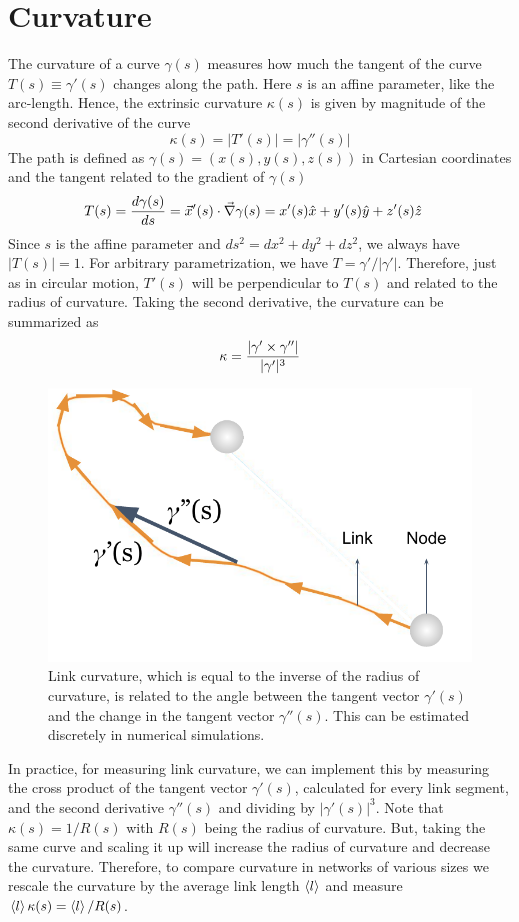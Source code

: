 \documentclass[nofootinbib,preprint,floatfix,titlepage,endfloats,superscriptaddress]{revtex4} %
\begin{document}
\section{Curvature\label{ap:curvature}}
The curvature of a curve $\gamma(s)$ measures how much the tangent of the curve $T(s) \equiv \gamma'(s)$ changes along the path. 
Here $s$ is an affine parameter, like the arc-length.  
Hence, the extrinsic curvature $\kappa(s)$ is given by magnitude of the second derivative of the curve 
\begin{equation}
    \kappa(s) = |T'(s)| = |\gamma''(s)|
\end{equation}
The path is defined as $\gamma(s) = (x(s),y(s),z(s))$ in Cartesian coordinates and the tangent related to the gradient of $\gamma(s)$
\begin{align}
    T(s) &= {d \gamma(s) \over ds} = \vec{x}'(s)\cdot \vec{\nabla} \gamma(s) = x'(s)\hat{x}+y'(s)\hat{y}+z'(s)\hat{z} 
\end{align}
Since $s$ is the affine parameter and $ds^2 = dx^2 + dy^2 + dz^2$, we always have $|T(s)|=1$. 
For arbitrary parametrization, we have $T = \gamma'/|\gamma'|$.
Therefore, just as in circular motion, $T'(s)$ will be perpendicular to $T(s)$ and related to the radius of curvature. 
Taking the second derivative, the curvature can be summarized as 
\begin{equation}
    \kappa = {|\gamma'\times \gamma''|\over |\gamma'|^{3}}
\end{equation}
\begin{figure}
    \centering
    \includegraphics[width = .5\columnwidth]{fig-09-19/curvature.pdf}
    \caption{Link curvature, which is equal to the inverse of the radius of curvature, is related to the angle between the tangent vector $\gamma'(s)$ and the change in the tangent vector $\gamma''(s)$. This can be estimated discretely in numerical simulations.}
    \label{fig:curvature}
\end{figure}
In practice, for measuring link curvature, we can implement this by measuring the cross product of the tangent vector $\gamma'(s)$, calculated for every link segment, and the second derivative $\gamma''(s)$ and dividing by $|\gamma'(s)|^3$. 
Note that $\kappa(s) = 1/R(s)$ with $R(s)$ being the radius of curvature. 
But, taking the same curve and scaling it up will increase the radius of curvature and decrease the curvature. 
Therefore, to compare curvature in networks of various sizes we rescale the curvature by the average link length $\left<l\right>$ and measure $\left<l\right>\kappa(s) = \left<l\right>/R(s)$.
\end{document}
